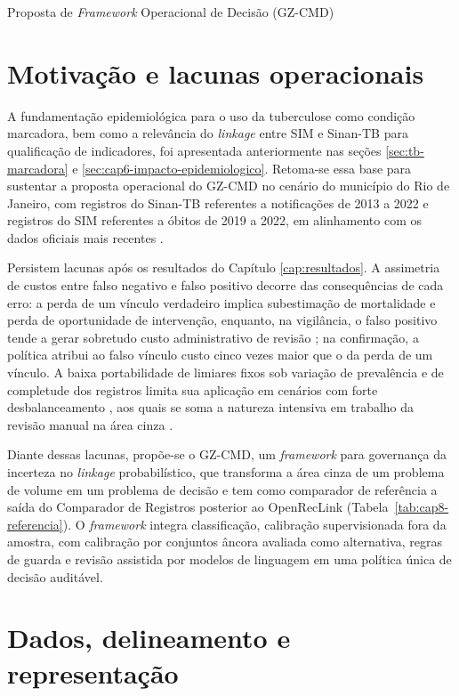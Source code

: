 \begin{chapter}{Proposta de \textit{Framework} Operacional de Decisão (GZ-CMD)}
\label{cap:gzcmd}

\section{Motivação e lacunas operacionais}
\label{sec:cap8-motivacao}

A fundamentação epidemiológica para o uso da tuberculose como condição marcadora, bem como a relevância do \textit{linkage} entre SIM e Sinan-TB para qualificação de indicadores, foi apresentada anteriormente nas seções \ref{sec:tb-marcadora} e \ref{sec:cap6-impacto-epidemiologico}. Retoma-se essa base para sustentar a proposta operacional do GZ-CMD no cenário do município do Rio de Janeiro, com registros do Sinan-TB referentes a notificações de 2013 a 2022 e registros do SIM referentes a óbitos de 2019 a 2022, em alinhamento com os dados oficiais mais recentes \cite{WHO2024tb,Brasil2024tb}.

Persistem lacunas após os resultados do Capítulo \ref{cap:resultados}. A assimetria de custos entre falso negativo e falso positivo decorre das consequências de cada erro: a perda de um vínculo verdadeiro implica subestimação de mortalidade e perda de oportunidade de intervenção, enquanto, na vigilância, o falso positivo tende a gerar sobretudo custo administrativo de revisão \cite{Oliveira2016accuracy}; na confirmação, a política atribui ao falso vínculo custo cinco vezes maior que o da perda de um vínculo. A baixa portabilidade de limiares fixos sob variação de prevalência e de completude dos registros limita sua aplicação em cenários com forte desbalanceamento \cite{Shaw2022biases}, aos quais se soma a natureza intensiva em trabalho da revisão manual na área cinza \cite{Christen2012book,Coeli2021suboptimal}.

Diante dessas lacunas, propõe-se o GZ-CMD, um \textit{framework} para governança da incerteza no \textit{linkage} probabilístico, que transforma a área cinza de um problema de volume em um problema de decisão e tem como comparador de referência a saída do Comparador de Registros posterior ao OpenRecLink (Tabela~\ref{tab:cap8-referencia}). O \textit{framework} integra classificação, calibração supervisionada fora da amostra, com calibração por conjuntos âncora avaliada como alternativa, regras de guarda e revisão assistida por modelos de linguagem em uma política única de decisão auditável.

\section{Dados, delineamento e representação}
\label{sec:cap8-dados}


\end{chapter}
